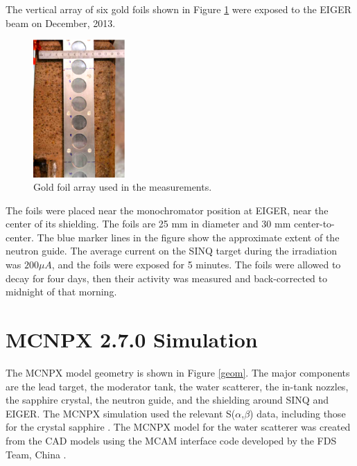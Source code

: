 \documentclass[a4paper,
              ]{jacow}
\begin{document}
The vertical array of six gold foils shown in Figure \ref{foils} were exposed to the EIGER beam on December, 2013.   

\begin{figure}[!htb]
   \centering
   \includegraphics*[width=35mm,angle=90]{graphics/foils.eps}
   \caption{Gold foil array used in the measurements.}
   \label{foils}
\end{figure}

The foils were placed near the monochromator position at EIGER, near the center of its shielding.  The foils are 25 mm in diameter and 30 mm center-to-center.  The blue marker lines in the figure show the approximate extent of the neutron guide.  The average current on the SINQ target during the irradiation was $200 \mu A$, and the foils were exposed for 5 minutes.  The foils were allowed to decay for four days, then their activity was measured and back-corrected to midnight of that morning.


\section{MCNPX 2.7.0 Simulation}

The MCNPX model geometry is shown in Figure \ref{geom}.  The major components are the lead target, the moderator tank, the water scatterer, the in-tank nozzles, the sapphire crystal, the neutron guide, and the shielding around SINQ and EIGER.  The MCNPX simulation used the relevant S($\alpha$,$\beta$) data, including those for the crystal sapphire \cite{sapp}.  The MCNPX model for the water scatterer was created from the CAD models using the MCAM interface code developed by the FDS Team, China \cite{mcam}.
\end{document}
